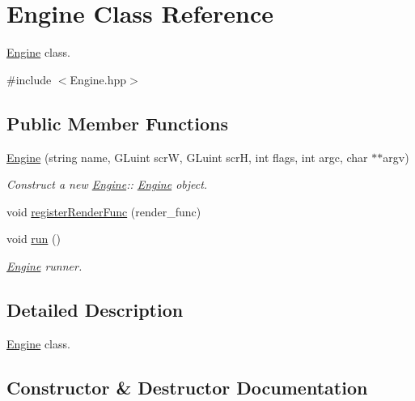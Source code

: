 \hypertarget{classEngine}{}\section{Engine Class Reference}
\label{classEngine}


\mbox{\hyperlink{classEngine}{Engine}} class.  




{\ttfamily \#include $<$Engine.\+hpp$>$}

\subsection*{Public Member Functions}
\begin{DoxyCompactItemize}
\item 
\mbox{\hyperlink{classEngine_af78070b14c3c778c13275deea31a647b}{Engine}} (string name, G\+Luint scrW, G\+Luint scrH, int flags, int argc, char $\ast$$\ast$argv)
\begin{DoxyCompactList}\small\item\em Construct a new \mbox{\hyperlink{classEngine}{Engine}}\+:\+: \mbox{\hyperlink{classEngine}{Engine}} object. \end{DoxyCompactList}\item 
void \mbox{\hyperlink{classEngine_a26dae231bdb8beba1038832899777700}{register\+Render\+Func}} (render\+\_\+func)
\item 
void \mbox{\hyperlink{classEngine_a1a210cf30d6bd330b3649439ecd6d6cc}{run}} ()
\begin{DoxyCompactList}\small\item\em \mbox{\hyperlink{classEngine}{Engine}} runner. \end{DoxyCompactList}\end{DoxyCompactItemize}


\subsection{Detailed Description}
\mbox{\hyperlink{classEngine}{Engine}} class. 



\subsection{Constructor \& Destructor Documentation}
\mbox{\label{classEngine_af78070b14c3c778c13275deea31a647b}} 
